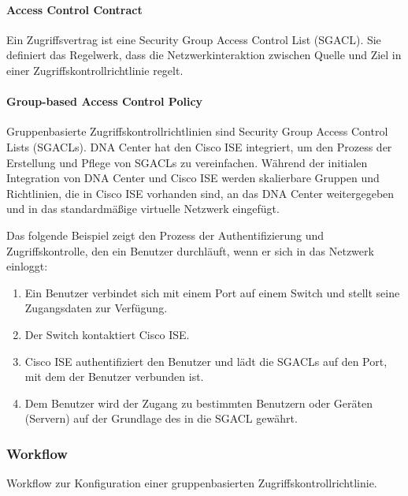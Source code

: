 \paragraph{Access Control Contract}
Ein Zugriffsvertrag ist eine Security Group Access Control List (SGACL). Sie definiert das Regelwerk, dass die Netzwerkinteraktion zwischen Quelle und Ziel in einer Zugriffskontrollrichtlinie regelt.

\paragraph{Group-based Access Control Policy}
Gruppenbasierte Zugriffskontrollrichtlinien sind Security Group Access Control Lists (SGACLs). DNA Center hat den Cisco ISE integriert, um den Prozess der Erstellung und Pflege von SGACLs zu vereinfachen. Während der initialen Integration von DNA Center und Cisco ISE werden skalierbare Gruppen und Richtlinien, die in Cisco ISE vorhanden sind, an das DNA Center weitergegeben und in das standardmäßige virtuelle Netzwerk eingefügt.

Das folgende Beispiel zeigt den Prozess der Authentifizierung und Zugriffskontrolle, den ein Benutzer durchläuft, wenn er sich in das Netzwerk einloggt:
\begin{enumerate}
	\item Ein Benutzer verbindet sich mit einem Port auf einem Switch und stellt seine Zugangsdaten zur Verfügung.
	\item Der Switch kontaktiert Cisco ISE.
	\item Cisco ISE authentifiziert den Benutzer und lädt die SGACLs auf den Port, mit dem der Benutzer verbunden ist.
	\item  Dem Benutzer wird der Zugang zu bestimmten Benutzern oder Geräten (Servern) auf der Grundlage des in die SGACL gewährt.
\end{enumerate}





\subsubsection{Workflow}
Workflow zur Konfiguration einer gruppenbasierten Zugriffskontrollrichtlinie.


